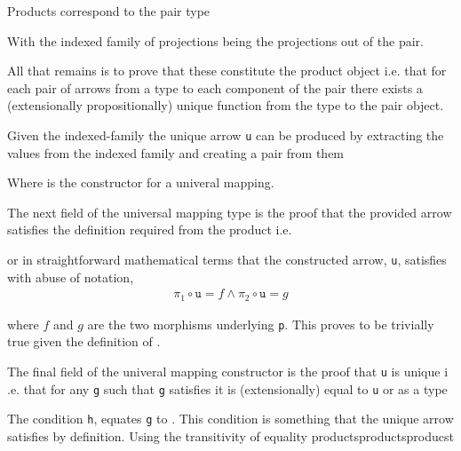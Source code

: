 Products correspond to the pair type


With the indexed family of projections being the projections out of the pair.


All that remains is to prove that these constitute the product object i.e. that
for each pair of arrows from a type to each component of the pair there exists a
(extensionally propositionally) unique function from the type to the pair object.


Given the indexed-family the unique arrow \verb|u| can be produced by extracting
the values from the indexed family and creating a pair from them


Where  is the constructor for a univeral mapping.

The next field of the universal mapping type is the proof that the provided
arrow satisfies the definition required from the product i.e.


or in straightforward mathematical terms that the constructed arrow, \verb|u|,
satisfies with abuse of notation,
\begin{align*}
    \pi_{1} \circ \texttt{u} = f \land \pi_{2} \circ \texttt{u} = g
\end{align*}

where $f$ and $g$ are the two morphisms underlying \verb|p|. This proves to be
trivially true given the definition of .


The final field of the univeral mapping constructor is the proof that \verb|u|
is unique i .e. that for any \verb|g| such that \verb|g| satisfies
 it is (extensionally) equal to \verb|u| or as a
type


The condition \verb|h|, equates \verb|g| to . This condition is
something that the unique arrow satisfies by definition. Using the transitivity
of equality 
productsproductsproducst

